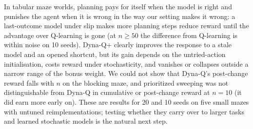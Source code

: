 In tabular maze worlds, planning pays for itself when the model is right and punishes the agent when it is wrong in the way our setting makes it wrong: a last-outcome model under  slip makes more planning steps reduce reward until the advantage over Q-learning is gone (at $n\ge50$ the difference from Q-learning is within noise on 10 seeds). Dyna-Q+ clearly improves the response to a stale model and an opened shortcut, but its gain depends on the untried-action initialisation, costs reward under stochasticity, and vanishes or collapses outside a narrow range of the bonus weight. We could not show that Dyna-Q's post-change reward falls with $n$ on the blocking maze, and prioritized sweeping was not distinguishable from Dyna-Q in cumulative or post-change reward at $n=10$ (it did earn more early on). These are results for 20 and 10 seeds on five small mazes with untuned reimplementations; testing whether they carry over to larger tasks and learned stochastic models is the natural next step.
